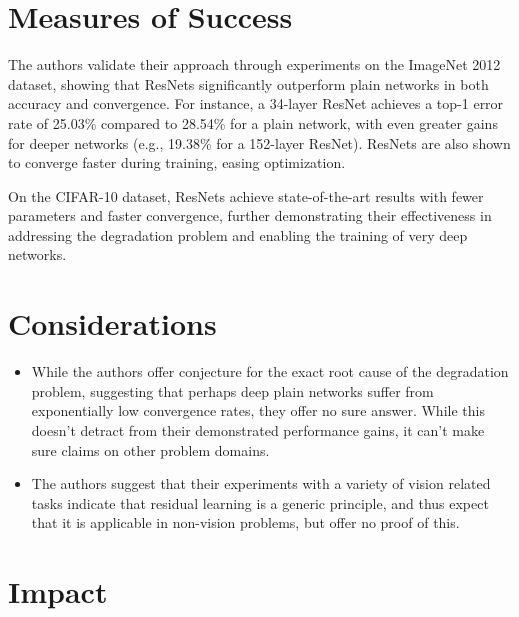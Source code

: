 \documentclass[10pt]{article}
\begin{document}
\section*{Measures of Success}
The authors validate their approach through experiments on the ImageNet 2012 dataset, showing that ResNets significantly outperform plain networks in both accuracy and convergence. For instance, a 34-layer ResNet achieves a top-1 error rate of 25.03\% compared to 28.54\% for a plain network, with even greater gains for deeper networks (e.g., 19.38\% for a 152-layer ResNet). ResNets are also shown to converge faster during training, easing optimization.

On the CIFAR-10 dataset, ResNets achieve state-of-the-art results with fewer parameters and faster convergence, further demonstrating their effectiveness in addressing the degradation problem and enabling the training of very deep networks.

\section*{Considerations}

\begin{itemize}
    \item While the authors offer conjecture for the exact root cause of the degradation problem, suggesting that perhaps deep plain networks suffer from exponentially low convergence rates, they offer no sure answer. While this doesn't detract from their demonstrated performance gains, it can't make sure claims on other problem domains.
    \item The authors suggest that their experiments with a variety of vision related tasks indicate that residual learning is a generic principle, and thus expect that it is applicable in non-vision problems, but offer no proof of this.
\end{itemize}







\section*{Impact}
\end{document}
